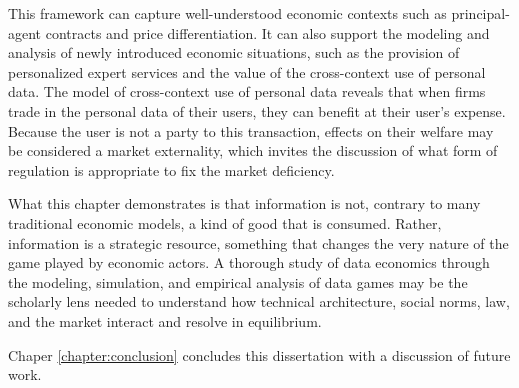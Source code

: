 \documentclass[../thesis.tex]{subfiles}
\begin{document}
 This framework can capture well-understood economic
 contexts such as principal-agent contracts and
 price differentiation.
 It can also support the modeling and analysis of
 newly introduced economic situations, such as the provision
 of personalized expert services and the
 value of the cross-context use of personal data.
 The model of cross-context use of personal data
 reveals that when firms trade in the personal data
 of their users, they can benefit at their user's expense.
 Because the user is not a party to this transaction,
 effects on their welfare may be considered a market externality,
 which invites the discussion of what form of
 regulation is appropriate to fix the market deficiency.

 What this chapter demonstrates is that information
 is not, contrary to many traditional economic models,
 a kind of good that is consumed.
 Rather, information is a strategic resource, something
 that changes the very nature of the game played by
 economic actors.
 A thorough study of data economics through the
 modeling, simulation, and empirical analysis of
 data games may be the scholarly lens needed to
 understand how technical architecture, social norms,
 law, and the market interact and resolve in equilibrium.

 Chaper \ref{chapter:conclusion} concludes this dissertation
 with a discussion of future work.
 
\end{document}
